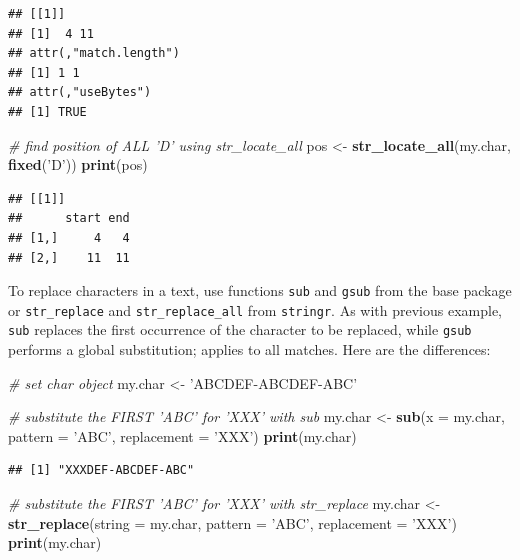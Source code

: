 \documentclass[11pt,]{book}
\newenvironment{Shaded}{\begin{snugshade}}{\end{snugshade}}
\newcommand{\KeywordTok}[1]{\textcolor[rgb]{0.27,0.27,0.27}{\textbf{#1}}}
\newcommand{\DataTypeTok}[1]{\textcolor[rgb]{0.27,0.27,0.27}{#1}}
\newcommand{\StringTok}[1]{\textcolor[rgb]{0.5,0.5,0.5}{#1}}
\newcommand{\CommentTok}[1]{\textcolor[rgb]{0.56,0.35,0.01}{\textit{#1}}}
\newcommand{\NormalTok}[1]{#1}
\begin{document}
\begin{verbatim}
## [[1]]
## [1]  4 11
## attr(,"match.length")
## [1] 1 1
## attr(,"useBytes")
## [1] TRUE
\end{verbatim}

\begin{Shaded}
\begin{Highlighting}[]
\CommentTok{# find position of ALL 'D' using str_locate_all}
\NormalTok{pos <-}\StringTok{ }\KeywordTok{str_locate_all}\NormalTok{(my.char, }\KeywordTok{fixed}\NormalTok{(}\StringTok{'D'}\NormalTok{))}
\KeywordTok{print}\NormalTok{(pos)}
\end{Highlighting}
\end{Shaded}

\begin{verbatim}
## [[1]]
##      start end
## [1,]     4   4
## [2,]    11  11
\end{verbatim}

To replace characters in a text, use functions \texttt{sub} and
\texttt{gsub} from the base package or \texttt{str\_replace} and
\texttt{str\_replace\_all} from \texttt{stringr}. As with previous
example, \texttt{sub} replaces the first occurrence of the character to
be replaced, while \texttt{gsub} performs a global substitution; applies
to all matches. Here are the differences: 
 

\begin{Shaded}
\begin{Highlighting}[]
\CommentTok{# set char object}
\NormalTok{my.char <-}\StringTok{ 'ABCDEF-ABCDEF-ABC'}

\CommentTok{# substitute the FIRST 'ABC' for 'XXX' with sub}
\NormalTok{my.char <-}\StringTok{ }\KeywordTok{sub}\NormalTok{(}\DataTypeTok{x =}\NormalTok{ my.char, }
               \DataTypeTok{pattern =} \StringTok{'ABC'}\NormalTok{, }
               \DataTypeTok{replacement =} \StringTok{'XXX'}\NormalTok{)}
\KeywordTok{print}\NormalTok{(my.char)}
\end{Highlighting}
\end{Shaded}

\begin{verbatim}
## [1] "XXXDEF-ABCDEF-ABC"
\end{verbatim}

\begin{Shaded}
\begin{Highlighting}[]
\CommentTok{# substitute the FIRST 'ABC' for 'XXX' with str_replace}
\NormalTok{my.char <-}\StringTok{ }\KeywordTok{str_replace}\NormalTok{(}\DataTypeTok{string =}\NormalTok{ my.char, }
                       \DataTypeTok{pattern =} \StringTok{'ABC'}\NormalTok{, }
                       \DataTypeTok{replacement =} \StringTok{'XXX'}\NormalTok{)}
\KeywordTok{print}\NormalTok{(my.char)}
\end{Highlighting}
\end{Shaded}
\end{document}
